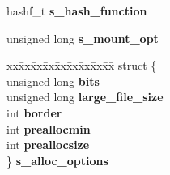 \begin{DoxyCompactItemize}
hashf\+\_\+t {\bfseries s\+\_\+hash\+\_\+function}
\item 
\mbox{\label{structreiserfs__sb__info_a3e902b029dcc81fa8d9b10b59aed247d}} 
unsigned long {\bfseries s\+\_\+mount\+\_\+opt}
\item 
\mbox{\label{structreiserfs__sb__info_a2cff1dbb65ced6eb7917b61a643993d3}} 
\begin{tabbing}
xx\=xx\=xx\=xx\=xx\=xx\=xx\=xx\=xx\=\kill
struct \{\\
\>unsigned long {\bfseries bits}\\
\>unsigned long {\bfseries large\_file\_size}\\
\>int {\bfseries border}\\
\>int {\bfseries preallocmin}\\
\>int {\bfseries preallocsize}\\
\} {\bfseries s\_alloc\_options}\\


\end{tabbing}
\end{DoxyCompactItemize}
